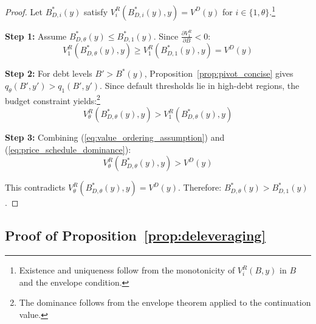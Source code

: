\documentclass[12pt]{article}
\theoremstyle{plain}
\begin{document}
\begin{proof}
	Let $B^*_{D,i}(y)$ satisfy $V^R_i(B^*_{D,i}(y), y) = V^D(y)$ for $i \in \{1, \theta\}$.\footnote{Existence and uniqueness follow from the monotonicity of $V^R_i(B,y)$ in $B$ and the envelope condition.}

	\textbf{Step 1:} Assume $B^*_{D,\theta}(y) \leq B^*_{D,1}(y)$. Since $\frac{\partial V^R_1}{\partial B} < 0$:
	\begin{equation}
		V^R_1(B^*_{D,\theta}(y), y) \geq V^R_1(B^*_{D,1}(y), y) = V^D(y) \label{eq:value_ordering_assumption}
	\end{equation}

	\textbf{Step 2:} For debt levels $B' > B^*(y)$, Proposition~\ref{prop:pivot_concise} gives $q_\theta(B', y') > q_1(B', y')$. Since default thresholds lie in high-debt regions, the budget constraint yields:\footnote{The dominance follows from the envelope theorem applied to the continuation value.}
	\begin{equation}
		V^R_\theta(B^*_{D,\theta}(y), y) > V^R_1(B^*_{D,\theta}(y), y) \label{eq:price_schedule_dominance}
	\end{equation}

	\textbf{Step 3:} Combining (\ref{eq:value_ordering_assumption}) and (\ref{eq:price_schedule_dominance}):
	\begin{equation}
		V^R_\theta(B^*_{D,\theta}(y), y) > V^D(y) \label{eq:contradiction_result}
	\end{equation}

	This contradicts $V^R_\theta(B^*_{D,\theta}(y), y) = V^D(y)$. Therefore:
	$B^*_{D,\theta}(y) > B^*_{D,1}(y)$.
\end{proof}

\subsection{Proof of Proposition~\ref{prop:deleveraging}}\label{app:proof_deleveraging}
\end{document}
